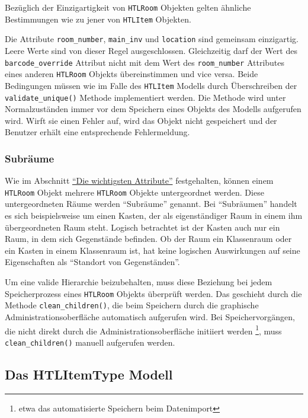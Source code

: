 Bezüglich der Einzigartigkeit von \texttt{HTLRoom} Objekten gelten
ähnliche Bestimmungen wie zu jener von \texttt{HTLItem} Objekten.

Die Attribute \texttt{room\_number}, \texttt{main\_inv} und
\texttt{location} sind gemeinsam einzigartig. Leere Werte sind von
dieser Regel ausgeschlossen. Gleichzeitig darf der Wert des
\texttt{barcode\_override} Attribut nicht mit dem Wert des
\texttt{room\_number} Attributes eines anderen \texttt{HTLRoom} Objekts
übereinstimmen und vice versa. Beide Bedingungen müssen wie im Falle des
\texttt{HTLItem} Modells durch Überschreiben der
\texttt{validate\_unique()} Methode \cite{django-doku-models-instances}
implementiert werden. Die Methode wird unter Normalzuständen immer vor
dem Speichern eines Objekts des Modells aufgerufen wird. Wirft sie einen
Fehler auf, wird das Objekt nicht gespeichert und der Benutzer erhält
eine entsprechende Fehlermeldung.

\hypertarget{subruxe4ume}{%
\subsubsection{Subräume}\label{subruxe4ume}}

Wie im Abschnitt \protect\hyperlink{die-wichtigsten-attribute-1}{``Die
wichtigsten Attribute''} festgehalten, können einem \texttt{HTLRoom}
Objekt mehrere \texttt{HTLRoom} Objekte untergeordnet werden. Diese
untergeordneten Räume werden ``Subräume'' genannt. Bei ``Subräumen''
handelt es sich beispielsweise um einen Kasten, der als eigenständiger
Raum in einem ihm übergeordneten Raum steht. Logisch betrachtet ist der
Kasten auch nur ein Raum, in dem sich Gegenstände befinden. Ob der Raum
ein Klassenraum oder ein Kasten in einem Klassenraum ist, hat keine
logischen Auswirkungen auf seine Eigenschaften als ``Standort von
Gegenständen''.

Um eine valide Hierarchie beizubehalten, muss diese Beziehung bei jedem
Speicherprozess eines \texttt{HTLRoom} Objekts überprüft werden. Das
geschieht durch die Methode \texttt{clean\_children()}, die beim
Speichern durch die graphische Administrationsoberfläche automatisch
aufgerufen wird. Bei Speichervorgängen, die nicht direkt durch die
Administrationsoberfläche initiiert werden \footnote{etwa das
  automatisierte Speichern beim Datenimport}, muss
\texttt{clean\_children()} manuell aufgerufen werden.

\hypertarget{das-htlitemtype-modell}{%
\subsection{Das HTLItemType Modell}\label{das-htlitemtype-modell}}

